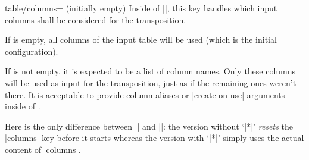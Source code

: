 \begin{commandlist}
	\begin{pgfplotskey}{table/columns= (initially empty)}
		Inside of |\pgfplotstabletranspose|, this key handles which input columns shall be considered for the transposition.

		If  is empty, all columns of the input table will be used (which is the initial configuration).

		If  is not empty, it is expected to be a list of column names. Only these columns will be used as input for the transposition, just as if the remaining ones weren't there. It is acceptable to provide column aliases or |create on use| arguments inside of .
\begin{codeexample}[]
\pgfplotstabletranspose[columns={a,b}]
\loadedtable
\end{codeexample}

		Here is the only difference between |\pgfplotstabletranspose| and |\pgfplotstabletranspose*|: the version without `|*|' \emph{resets} the |columns| key before it starts whereas the version with `|*|' simply uses the actual content of |columns|.
	\end{pgfplotskey}
\end{commandlist}

